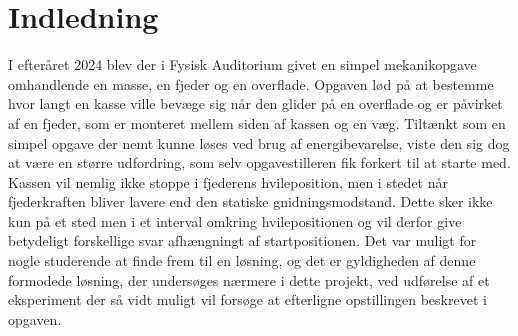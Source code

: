 \chapter{Indledning}
I efteråret 2024 blev der i Fysisk Auditorium givet en simpel mekanikopgave
omhandlende en masse, en fjeder og en overflade. Opgaven lød  på at bestemme hvor
langt en kasse ville bevæge sig når den glider på en overflade og er påvirket af en fjeder, 
som er monteret mellem siden af kassen og en væg. Tiltænkt som en simpel opgave der nemt kunne løses 
ved brug af energibevarelse, viste den sig dog at være en større udfordring, som selv opgavestilleren fik forkert til at starte med.
Kassen vil nemlig ikke stoppe i fjederens hvileposition, men i stedet når fjederkraften bliver lavere end den statiske gnidningsmodstand. Dette sker ikke kun på et sted men
i et interval omkring hvilepositionen og vil derfor give betydeligt forskellige svar 
afhængningt af startpositionen. Det var muligt for nogle studerende at finde frem til en løsning, 
og det er gyldigheden af denne formodede løsning, 
der undersøges nærmere i dette projekt, ved udførelse af et eksperiment der så vidt muligt vil forsøge at efterligne opstillingen beskrevet i opgaven.